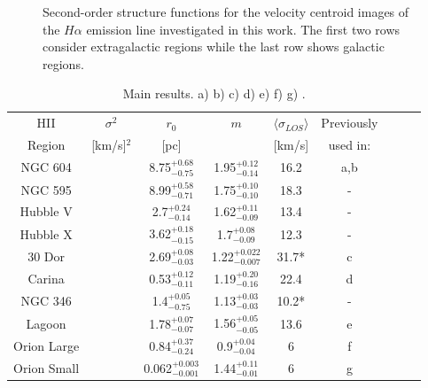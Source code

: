 \documentclass[fleqn,usenatbib, useAMS, a4paper]{mnras}
\begin{document}
\begin{figure}
\begin{multicols}{3}
 \end{multicols}
 \caption{Second-order structure functions for the velocity centroid images of the \(H\alpha\) emission line investigated in this work. The first two rows consider extragalactic regions while the last row shows galactic regions.}
 \label{fig:SFs}
\end{figure}

\begin{table}
 \begin{center}\caption{Main results.
  a) \citet{tanco1997}
      b) \citet{2019arXiv191203543M}
      c) \citet{Castro:2018a}
      d) \citet{Damiani:2016a}
      e) \citet{Damiani:2017b}
      f) \citet{1987A&A...176..347H}
      g) \citet{arthur2016turbulence}.}
 \begin{tabular}{ccccccccc}\hline
 HII         &\(\sigma^{2}\) &\(r_0\)                     &\(m\)    &\(\langle \sigma_{LOS} \rangle \) & Previously\\
 Region      &[km/s]$^{2}$     &[pc]                        &                           &  [km/s]& used in:\\ \hline
 NGC 604     &      &8.75\(^{+0.68}_{-0.75}\)    &1.95\(^{+0.12}_{-0.14}\)   &16.2  &a,b \\
 NGC 595     &       &8.99\(^{+0.58}_{-0.71}\)    &1.75\(^{+0.10}_{-0.10}\)   &18.3  &- \\
 Hubble V    &      &2.7\(^{+0.24}_{-0.14}\)     &1.62\(^{+0.11}_{-0.09}\)   &13.4  &- \\ 
 Hubble X    &       &3.62\(^{+0.18}_{-0.15}\)    &1.7\(^{+0.08}_{-0.09}\)    &12.3  &- \\   
 30 Dor      &        &2.69\(^{+0.08}_{-0.03}\)    &1.22\(^{+0.022}_{-0.007}\) &31.7* &c\\
 Carina      &        &0.53\(^{+0.12}_{-0.11}\)    &1.19\(^{+0.20}_{ -0.16}\)  &22.4  &d\\
 NGC 346     &        &1.4\(^{+0.05}_{-0.75}\)     &1.13\(^{+0.03}_{-0.03}\)   &10.2* &-\\
 Lagoon      &        &1.78\(^{+0.07}_{-0.07}\)    &1.56\(^{+0.05}_{-0.05}\)   &13.6  &e\\ 
 Orion Large &        &0.84\(^{+0.37}_{-0.24}\)    &0.9\(^{+0.04}_{-0.04}\)    &6     &f \\
 Orion Small &        & 0.062\(^{+0.003}_{-0.001}\)&1.44\(^{+0.11}_{-0.01}\)   &6     &g \\\hline	  
 \end{tabular}\label{tab:Res}
 \end{center}
\end{table}  
\end{document}

